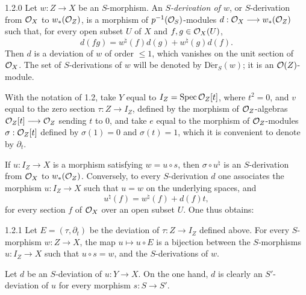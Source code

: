 \begin{definition}{1.2.0}\label{VIIA.1.2.0}
Let $w:Z\to X$ be an $S$-morphism. An \emph{$S$-derivation of $w$}, or $S$-derivation from $\mathcal{O}_X$ to $w_*(\mathcal{O}_Z)$, is a morphism of $p^{-1}(\mathcal{O}_S)$-modules $d:\mathcal{O}_X\longrightarrow w_*(\mathcal{O}_Z)$ such that, for every open subset $U$ of $X$ and $f,g\in\mathcal{O}_X(U)$,
\[
d(fg)=w^\natural(f)d(g)+w^\natural(g)d(f).
\]
Then $d$ is a deviation of $w$ of order $\leq1$, which vanishes on the unit section of $\mathcal{O}_X$. The set of $S$-derivations of $w$ will be denoted by $\operatorname{D\acute er}_S(w)$; it is an $\mathcal{O}(Z)$-module.
\end{definition}
With the notation of 1.2, take $Y$ equal to $I_Z=\operatorname{Spec}\mathcal{O}_Z[t]$, where $t^2=0$, and $v$ equal to the zero section $\tau:Z\to I_Z$, defined by the morphism of $\mathcal{O}_Z$-algebras $\mathcal{O}_Z[t]\longrightarrow\mathcal{O}_Z$ sending $t$ to $0$, and take $e$ equal to the morphism of $\mathcal{O}_Z$-modules $\sigma:\mathcal{O}_Z[t]$ defined by $\sigma(1)=0$ and $\sigma(t)=1$, which it is convenient to denote by $\partial_t$.

If $u:I_Z\to X$ is a morphism satisfying $w=u\circ s$, then $\sigma\circ u^\natural$ is an $S$-derivation from $\mathcal{O}_X$ to $w_*(\mathcal{O}_Z)$. Conversely, to every $S$-derivation $d$ one associates the morphism $u:I_Z\to X$ such that $u=w$ on the underlying spaces, and
\[
u^\natural(f)=w^\natural(f)+d(f)t,
\]
for every section $f$ of $\mathcal{O}_X$ over an open subset $U$. One thus obtains:

\begin{lemma}{1.2.1}\label{VIIA.1.2.1}
Let $E=(\tau,\partial_t)$ be the deviation of $\tau:Z\to I_Z$ defined above. For every $S$-morphism $w:Z\to X$, the map $u\mapsto u\circ E$ is a bijection between the $S$-morphisms $u:I_Z\to X$ such that $u\circ s=w$, and the $S$-derivations of $w$.
\end{lemma}

Let $d$ be an $S$-deviation of $u:Y\to X$. On the one hand, $d$ is clearly an $S'$-deviation of $u$ for every morphism $s:S\to S'$.

